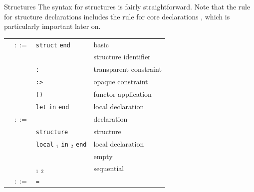 \begin{grammar}{Structures}
  The syntax for structures is fairly straightforward. Note that
  the rule for structure declarations  includes the
  rule for core declarations , which is particularly
  important later on.
\begin{longtable}{rcll}
\label{grammar:strexp}\nonterminal{strexp} & $::=$ & \texttt{struct} \nonterminal{strdec} \texttt{end}
& basic\\
& \alt & \nonterminal{longstrid} & structure identifier\\
&\alt& \nonterminal{strexp} \texttt{:} \hyperref[grammar:sigexp]{\nonterminal{sigexp}} & transparent constraint\\
&\alt& \nonterminal{strexp} \texttt{:>} \hyperref[grammar:sigexp]{\nonterminal{sigexp}} & opaque constraint\\
&\alt& \nonterminal{funid}\texttt{(}\nonterminal{strexp}\texttt{)} & functor application\\
&\alt&\texttt{let} \nonterminal{strdec} \texttt{in} \nonterminal{strexp} \texttt{end} & local declaration\\
\label{grammar:strdec}\nonterminal{strdec} & $::=$ & \hyperref[grammar:dec]{\nonterminal{dec}}
& declaration\\
&\alt&\texttt{structure} \nonterminal{strbind} & structure\\
&\alt&\texttt{local} \nonterminal{strdec}$_{1}$ \texttt{in} \nonterminal{strdec}$_{2}$ \texttt{end} & local declaration\\
&\alt& & empty\\
&\alt&\nonterminal{strdec}$_{1}$ \optional{\texttt{;}} \nonterminal{strdec}$_{2}$ & sequential\\
\label{grammar:strbind}\nonterminal{strbind} & $::=$ & \nonterminal{strid} \texttt{=} \nonterminal{strexp} \optional{\texttt{and} \nonterminal{strbind}} & \\
\end{longtable}
\end{grammar}

